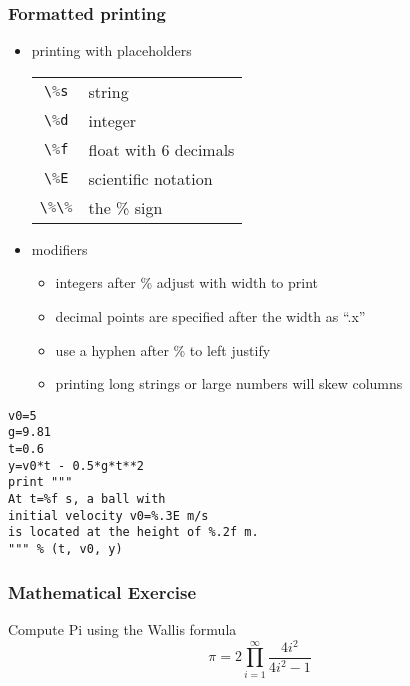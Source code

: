 \documentclass[xcolor=table,10pt,final]{beamer}
\begin{document}
\begin{frame}[fragile]
  \frametitle{Formatted printing}
  \begin{itemize}
    \item printing with placeholders
      \begin{table}
        \begin{tabular}{cl}
          \lstinline[language=python]|\%s| & string\\
          \lstinline[language=python]|\%d| & integer\\
          \lstinline[language=python]|\%f| & float with 6 decimals\\
          \lstinline[language=python]|\%E| & scientific notation\\
          \lstinline[language=python]|\%\%| & the \% sign
        \end{tabular}
      \end{table}
    \item modifiers
      \begin{itemize}
        \item integers after \% adjust with width to print
        \item decimal points are specified after the width as ``.x''
        \item use a hyphen after \% to left justify
        \item printing long strings or large numbers will skew columns
      \end{itemize}
  \end{itemize}
\begin{lstlisting}[langage=python]
v0=5
g=9.81
t=0.6
y=v0*t - 0.5*g*t**2
print """
At t=%f s, a ball with
initial velocity v0=%.3E m/s
is located at the height of %.2f m.
""" % (t, v0, y)
\end{lstlisting}
\end{frame}


\begin{frame}
  \frametitle{Mathematical Exercise}
  Compute Pi using the Wallis formula
  \vskip1cm
  \begin{equation*}
    \pi = 2\prod^{\infty}_{i=1}\frac{4i^2}{4i^2-1}
  \end{equation*}
\end{frame}
\end{document}
